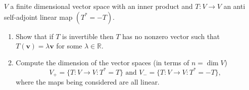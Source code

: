 \documentclass[11pt]{article}
\theoremstyle{definition}
\newenvironment{customex}[1]
  {\renewcommand\theinnercustomex{#1}\innercustomex}
  {\endinnercustomex}
\newcommand{\R}{\mathbb{R}}
\newcommand{\vv}{\mathbf{v}}
\begin{document}
    \begin{customex}{\textbf{9}}
        $V$ a finite dimensional vector space with an inner product and $T : V \to V$ an anti self-adjoint linear map $(T^* = -T)$.
        \begin{enumerate}[label = \alph*)]
            \item Show that if $T$ is invertible then $T$ has no nonzero vector such that $T(\vv) = \lambda \vv$ for some $\lambda \in \R$.
            \item Compute the dimension of the vector spaces (in terms of $n = \dim V$)
                $$V_+ = \{T: V \to V : T^* = T\} \text{ and } V_- = \{T: V \to V : T^* = -T\},$$
            where the maps being considered are all linear.
        \end{enumerate}
    \end{customex}
\end{document}
